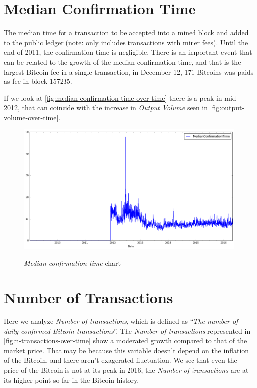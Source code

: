 
\section{Median Confirmation Time}
\label{sec:median-confirmation-time}

The median time for a transaction to be accepted into a mined block
and added to the public ledger (note: only includes transactions with
miner fees). Until the end of 2011, the confirmation time is
negligible. There is an important event that can be related to the
growth of the median confirmation time, and that is the largest
Bitcoin fee in a single transaction, in December 12, 171 Bitcoins was
paids as fee in block 157235.

If we look at \autoref{fig:median-confirmation-time-over-time} there
is a peak in mid 2012, that can coincide with the increase in
\textit{Output Volume} seen in \autoref{fig:output-volume-over-time}.

\begin{figure}[bth]
  \myfloatalign
  {\includegraphics[width=1\linewidth]
    {gfx/median-confirmation-time-over-time}}
  \caption{\textit{Median confirmation time} chart}
  \label{fig:median-confirmation-time-over-time}
\end{figure}


\section{Number of Transactions}
\label{sec:n-transactions-multiple}

Here we analyze \textit{Number of transactions}, which is defined as
``\textit{The number of daily confirmed Bitcoin transactions}''. The
\textit{Number of transactions} represented in
\autoref{fig:n-transactions-over-time} show a moderated
growth compared to that of the market price. That may be because this
variable doesn't depend on the inflation of the Bitcoin, and there
aren't exagerated fluctuation. We see that even the price of the
Bitcoin is not at its peak in 2016, the \textit{Number of
  transactions} are at its higher point so far in the Bitcoin history.

